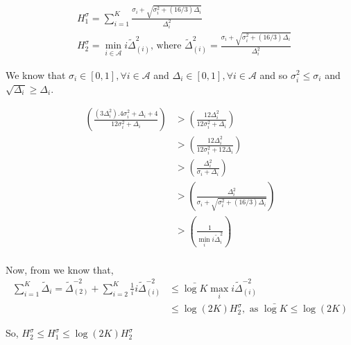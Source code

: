 \appendix
\begin{align*}
& H_{1}^{\sigma}=\sum_{i=1}^{K}\frac{\sigma_{i}+\sqrt{\sigma_{i}^{2}+(16/3)\Delta_{i}}}{\Delta_{i}^{2}}\\
& H_{2}^{\sigma}=\min_{i\in \mathcal{A}} i\tilde{\Delta}_{(i)}^{2} \text{, where } \tilde{\Delta}_{(i)}^{2}=\frac{\sigma_{i}+\sqrt{\sigma_{i}^{2}+(16/3)\Delta_{i}}}{\Delta_{i}^{2}}
\end{align*}

We know that $\sigma_{i}\in [0,1], \forall i\in \mathcal{A}$ and $\Delta_{i}\in [0,1], \forall i\in \mathcal{A}$ and so $\sigma_{i}^{2} \leq \sigma_{i}$ and $\sqrt{\Delta_{i}} \geq \Delta_{i}$.

\begin{align*}
\left(\frac{(3\Delta_{i}^{2}). 4\sigma_{i}^{2}+\Delta_{i}+4}{12\sigma_{i}^{2}+\Delta_{i}}\right) & >  \left(\frac{12\Delta_{i}^{2}}{12\sigma_{i}^{2}+\Delta_{i}}\right)\\
& > \left(\frac{12\Delta_{i}^{2}}{12\sigma_{i}^{2}+12\Delta_{i}}\right)\\
& > \left(\frac{\Delta_{i}^{2}}{\sigma_{i}+\Delta_{i}}\right)\\
& > \left(\frac{\Delta_{i}^{2}}{\sigma_{i}+\sqrt{\sigma_{i}^{2} + (16/3)\Delta_{i}}}\right)\\
& > \left(\frac{1}{\min_{i}i\tilde{\Delta}_{i}^{2}}\right)\\
\end{align*}

Now, from \cite{audibert2010best} we know that,
\begin{align*}
\sum_{i=1}^{K}\tilde{\Delta}_{i} = \tilde{\Delta}_{(2)}^{-2} + \sum_{i=2}^{K}\frac{1}{i}i\tilde{\Delta}_{(i)}^{-2} &\leq \bar{\log K}\max_{i}i\tilde{\Delta}_{(i)}^{-2}\\
& \leq \log(2K) H_{2}^{\sigma}, \text{ as $\bar{\log K} \leq \log(2K)$}
\end{align*}

So, $H_{2}^{\sigma} \leq H_{1}^{\sigma} \leq \log(2K) H_{2}^{\sigma}$

